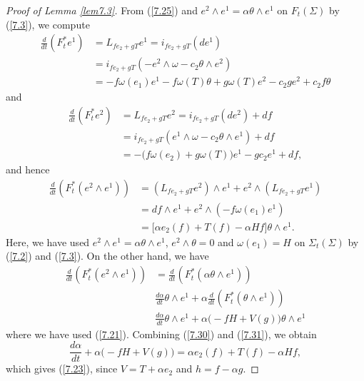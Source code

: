 \documentclass{amsart}
\theoremstyle{Corollary}
\numberwithin{equation}{section}
\begin{document}
\begin{proof}[Proof of Lemma \ref{lem7.3}]
From (\ref{7.25}) and $e^2\wedge e^1=\alpha \theta\wedge e^1$ on $F_t(\Sigma)$ by 
(\ref{7.3}), we compute 
\begin{equation*}
\begin{split}
\frac{d}{dt}(F_t^* e^1)
&=L_{fe_2+gT}e^1=i_{fe_2+gT}(de^1)\\
&=i_{fe_2+gT}(-e^2\wedge\omega-c_2\theta\wedge e^2)\\
&=-f\omega(e_1)e^1-f\omega(T)\theta+g\omega(T)e^2-c_2g e^2
+c_2f\theta
\end{split}
\end{equation*}
and 
\begin{equation*}
\begin{split}
\frac{d}{dt}(F_t^* e^2)
&=L_{fe_2+gT}e^2=i_{fe_2+gT}(de^2)+df\\
&=i_{fe_2+gT}(e^1\wedge\omega-c_2\theta\wedge e^1)+df\\
&=-\big(f\omega(e_2)+g\omega(T)\big)e^1-g c_2e^1+df, 
\end{split}
\end{equation*}
and hence
\begin{equation}\label{7.30}
\begin{split}
\frac{d}{dt}(F_t^*(e^2\wedge e^1))
&=(L_{fe_2+gT}e^2)\wedge e^1+e^2\wedge( L_{fe_2+gT}e^1)\\
&=df\wedge e^1+e^2\wedge (-f\omega(e_1)e^1)\\
&=\big[\alpha e_2(f)+T(f)-\alpha H f\big]\theta\wedge e^1.
\end{split}
\end{equation}
Here, we have used $e^2\wedge e^1=\alpha \theta\wedge e^1$, $e^2\wedge \theta=0$
and $\omega(e_1)=H$ on $\Sigma_t(\Sigma)$
by (\ref{7.2}) and (\ref{7.3}). 
On the other hand, we have 
\begin{equation}\label{7.31}
\begin{split}
\frac{d}{dt}(F_t^*(e^2\wedge e^1))
&=\frac{d}{dt}(F_t^*(\alpha\theta\wedge e^1))\\
&\frac{d\alpha}{dt}\theta\wedge e^1+\alpha \frac{d}{dt}(F_t^*(\theta\wedge e^1))\\
&\frac{d\alpha}{dt}\theta\wedge e^1+\alpha \big(-fH+V(g)\big)\theta\wedge e^1
\end{split}
\end{equation}
where we have used (\ref{7.21}).
Combining (\ref{7.30}) and (\ref{7.31}), we obtain 
\begin{equation*}
\frac{d\alpha}{dt}+\alpha \big(-fH+V(g)\big)
=\alpha e_2(f)+T(f)-\alpha H f,
\end{equation*}
which gives (\ref{7.23}), since $V=T+\alpha e_2$ and $h=f-\alpha g$. 


\end{proof}
\end{document}
